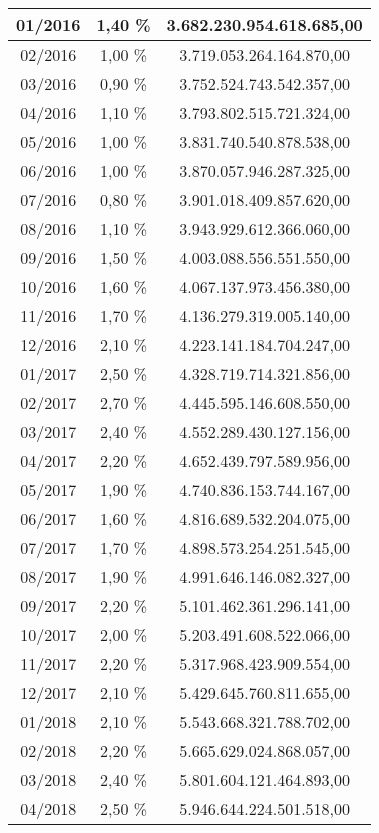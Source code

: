 \begin{center}
\begin{longtable}{|c|c|c|}
01/2016 & 1,40 \% & 3.682.230.954.618.685,00 \\ \hline
02/2016 & 1,00 \% & 3.719.053.264.164.870,00 \\ \hline
03/2016 & 0,90 \% & 3.752.524.743.542.357,00 \\ \hline
04/2016 & 1,10 \% & 3.793.802.515.721.324,00 \\ \hline
05/2016 & 1,00 \% & 3.831.740.540.878.538,00 \\ \hline
06/2016 & 1,00 \% & 3.870.057.946.287.325,00 \\ \hline
07/2016 & 0,80 \% & 3.901.018.409.857.620,00 \\ \hline
08/2016 & 1,10 \% & 3.943.929.612.366.060,00 \\ \hline
09/2016 & 1,50 \% & 4.003.088.556.551.550,00 \\ \hline
10/2016 & 1,60 \% & 4.067.137.973.456.380,00 \\ \hline
11/2016 & 1,70 \% & 4.136.279.319.005.140,00 \\ \hline
12/2016 & 2,10 \% & 4.223.141.184.704.247,00 \\ \hline
01/2017 & 2,50 \% & 4.328.719.714.321.856,00 \\ \hline
02/2017 & 2,70 \% & 4.445.595.146.608.550,00 \\ \hline
03/2017 & 2,40 \% & 4.552.289.430.127.156,00 \\ \hline
04/2017 & 2,20 \% & 4.652.439.797.589.956,00 \\ \hline
05/2017 & 1,90 \% & 4.740.836.153.744.167,00 \\ \hline
06/2017 & 1,60 \% & 4.816.689.532.204.075,00 \\ \hline
07/2017 & 1,70 \% & 4.898.573.254.251.545,00 \\ \hline
08/2017 & 1,90 \% & 4.991.646.146.082.327,00 \\ \hline
09/2017 & 2,20 \% & 5.101.462.361.296.141,00 \\ \hline
10/2017 & 2,00 \% & 5.203.491.608.522.066,00 \\ \hline
11/2017 & 2,20 \% & 5.317.968.423.909.554,00 \\ \hline
12/2017 & 2,10 \% & 5.429.645.760.811.655,00 \\ \hline
01/2018 & 2,10 \% & 5.543.668.321.788.702,00 \\ \hline
02/2018 & 2,20 \% & 5.665.629.024.868.057,00 \\ \hline
03/2018 & 2,40 \% & 5.801.604.121.464.893,00 \\ \hline
04/2018 & 2,50 \% & 5.946.644.224.501.518,00 \\ \hline

\end{longtable}
\end{center}
